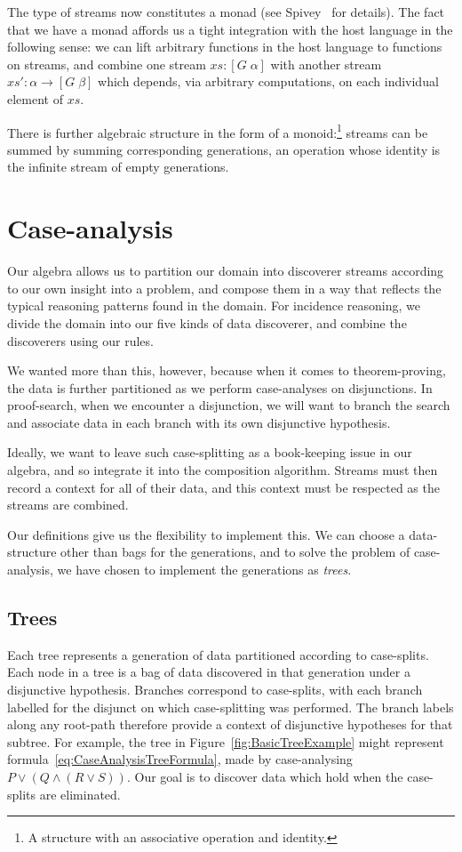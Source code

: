 The type of streams now constitutes a monad (see Spivey~\cite{SearchAlgebras} for details). The fact that we have a monad affords us a tight integration with the host language in the following sense: we can lift arbitrary functions in the host language to functions on streams, and combine one stream $xs : [G\;\alpha]$ with another stream $xs' : \alpha \rightarrow [G\;\beta]$ which depends, via arbitrary computations, on each individual element of $xs$. 

There is further algebraic structure in the form of a monoid:\footnote{A structure with an associative operation and identity.} streams can be summed by summing corresponding generations, an operation whose identity is the infinite stream of empty generations. 

\section{Case-analysis}\label{sec:CaseAnalysis}
Our algebra allows us to partition our domain into discoverer streams according to our own insight into a problem, and compose them in a way that reflects the typical reasoning patterns found in the domain. For incidence reasoning, we divide the domain into our five kinds of data discoverer, and combine the discoverers using our rules.

We wanted more than this, however, because when it comes to theorem-proving, the data is further partitioned as we perform case-analyses on disjunctions. In proof-search, when we encounter a disjunction, we will want to branch the search and associate data in each branch with its own disjunctive hypothesis. 

Ideally, we want to leave such case-splitting as a book-keeping issue in our algebra, and so integrate it into the composition algorithm. Streams must then record a context for all of their data, and this context must be respected as the streams are combined. 

Our definitions give us the flexibility to implement this. We can choose a data-structure other than bags for the generations, and to solve the problem of case-analysis, we have chosen to implement the generations as \emph{trees}. 

\subsection{Trees}\label{sec:Trees}
Each tree represents a generation of data partitioned according to case-splits. Each node in a tree is a bag of data discovered in that generation under a disjunctive hypothesis. Branches correspond to case-splits, with each branch labelled for the disjunct on which case-splitting was performed. The branch labels along any root-path therefore provide a context of disjunctive hypotheses for that subtree. For example, the tree in Figure~\ref{fig:BasicTreeExample} might represent formula~\ref{eq:CaseAnalysisTreeFormula}, made by case-analysing \mbox{$P \vee (Q \wedge (R \vee S))$}. Our goal is to discover data which hold when the case-splits are eliminated.

